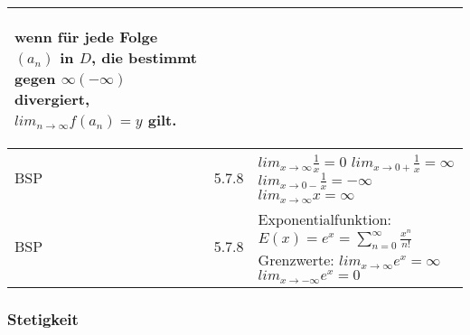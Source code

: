 \begin{longtable}{p{0.75cm} p{1cm} p{16cm}}
\begin{itemize}[topsep=-0.5cm]
                                        wenn für jede Folge $(a_n)$ in $D$, die bestimmt gegen $\infty (-\infty)$ divergiert,
                                        $lim_{n \rightarrow \infty} f(a_n) = y$ gilt.
                        \end{itemize} \vspace{-0cm} \\
        \midrule
        BSP & 5.7.8 &   $lim_{x \rightarrow \infty} \frac{1}{x} = 0$ \hfill \break
                        $lim_{x \rightarrow 0+} \frac{1}{x} = \infty$ \hfill \break
                        $lim_{x \rightarrow 0-} \frac{1}{x} = -\infty$ \hfill \break
                        $lim_{x \rightarrow \infty} x = \infty$ \\
        \midrule
        BSP & 5.7.8 &   Exponentialfunktion: $E(x) = e^x = \sum^{\infty}_{n=0} \frac{x^n}{n!}$ \hfill \break
        Grenzwerte: \hfill \break
        $lim_{x \rightarrow \infty} e^x = \infty$ \hfill \break
        $lim_{x \rightarrow -\infty} e^x = 0$ \\

        \bottomrule

    \end{longtable}

\subsubsection{Stetigkeit}

